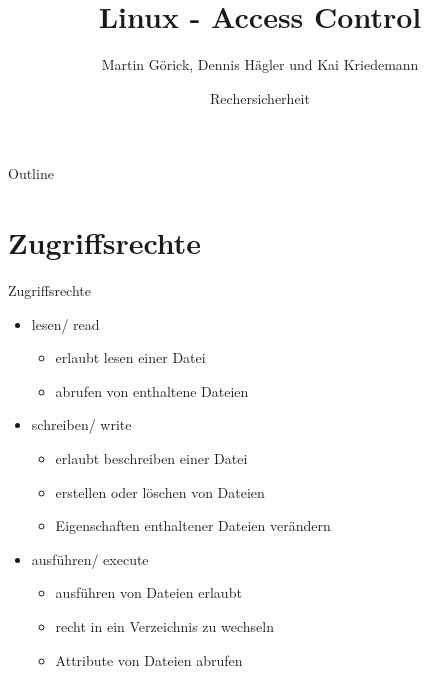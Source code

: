 \documentclass[ucs,9pt]{beamer}
\title[Linux - Access Control] %
{Linux - Access Control}
\subtitle
{}
\author[Author, Another] %
{Martin Görick, Dennis Hägler und Kai Kriedemann}
\institute[FU Berlin] %
{Freie Universität Berlin}
\date[] %
{Rechersicherheit}
\begin{document}
\begin{frame}[plain]
  \titlepage
\end{frame}

\begin{frame}{Outline}
  \tableofcontents[hideothersubsections]
\end{frame}



\section{Zugriffsrechte}

\begin{frame}{Zugriffsrechte}
\begin{itemize}
	\item lesen/ read
		\begin{itemize}
			\item erlaubt lesen einer Datei
			\item abrufen von enthaltene Dateien
		\end{itemize}
	\item schreiben/ write
		\begin{itemize}
			\item erlaubt beschreiben einer Datei
			\item erstellen oder löschen von Dateien
			\item Eigenschaften enthaltener Dateien verändern 
		\end{itemize}
	\item ausführen/ execute
		\begin{itemize}
			\item ausführen von Dateien erlaubt
			\item recht in ein Verzeichnis zu wechseln
			\item Attribute von Dateien abrufen
		\end{itemize}
\end{itemize}
\end{frame}
\end{document}

